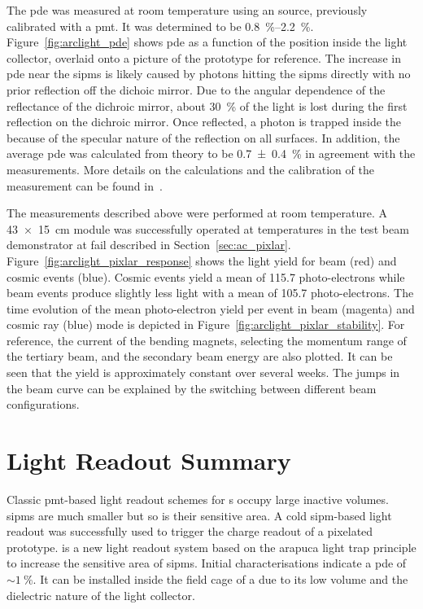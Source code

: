 The \gls{pde} was measured at room temperature using an  source, previously calibrated with a \gls{pmt}.
It was determined to be \SIrange{0.8}{2.2}{\percent}.
Figure~\ref{fig:arclight_pde} shows \gls{pde} as a function of the position inside the light collector, overlaid onto a picture of the prototype for reference.
The increase in \gls{pde} near the \glspl{sipm} is likely caused by photons hitting the \glspl{sipm} directly with no prior reflection off the dichoic mirror.
Due to the angular dependence of the reflectance of the dichroic mirror, about \SI{30}{\percent} of the light is lost during the first reflection on the dichroic mirror.
Once reflected, a photon is trapped inside the \AL{} because of the specular nature of the reflection on all surfaces.
In addition, the average \gls{pde} was calculated from theory to be \SI{0.7 +- 0.4}{\percent} in agreement with the measurements.
More details on the calculations and the calibration of the measurement can be found in~\cite{arclight}.

The measurements described above were performed at room temperature.
A \SI{43 x 15}{\centi\metre} \AL{} module was successfully operated at \lar{} temperatures in the \pixlar{} test beam demonstrator at \gls{fail} described in Section~\ref{sec:ac_pixlar}.
Figure~\ref{fig:arclight_pixlar_response} shows the light yield for beam (red) and cosmic events (blue).
Cosmic events yield a mean of \num{115.7} photo-electrons while beam events produce slightly less light with a mean of \num{105.7} photo-electrons.
The time evolution of the mean photo-electron yield per event in beam (magenta) and cosmic ray (blue) mode is depicted in Figure~\ref{fig:arclight_pixlar_stability}.
For reference, the current of the bending magnets, selecting the momentum range of the tertiary beam, and the secondary beam energy are also plotted.
It can be seen that the yield is approximately constant over several weeks.
The jumps in the beam curve can be explained by the switching between different beam configurations.


\section{Light Readout Summary}
\label{sec:studies_light-col-summary}

Classic \gls{pmt}-based light readout schemes for \lartpc{}s occupy large inactive volumes.
\glspl{sipm} are much smaller but so is their sensitive area.
A cold \gls{sipm}-based light readout was successfully used to trigger the charge readout of a pixelated \lartpc{} prototype.
\AL{} is a new light readout system based on the \gls{arapuca} light trap principle to increase the sensitive area of \glspl{sipm}.
Initial characterisations indicate a \gls{pde} of $\sim{\SI{1}{\percent}}$.
It can be installed inside the field cage of a \lartpc{} due to its low volume and the dielectric nature of the light collector.